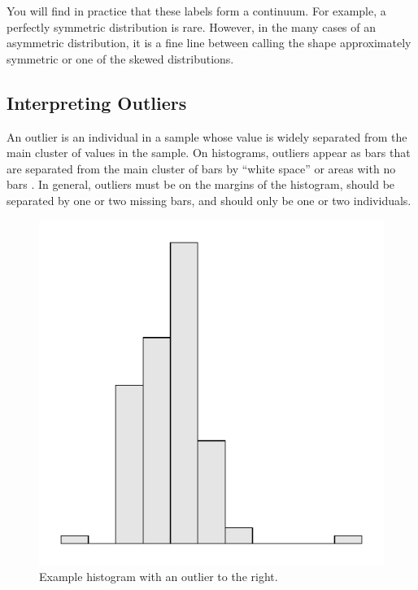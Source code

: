 \documentclass[10pt,openany]{book}\usepackage[]{graphicx}\usepackage[]{color}
\newenvironment{knitrout}{}{} %
\begin{document}
You will find in practice that these labels form a continuum.  For example, a perfectly symmetric distribution is rare.  However, in the many cases of an asymmetric distribution, it is a fine line between calling the shape approximately symmetric or one of the skewed distributions.



\subsection{Interpreting Outliers}
An outlier is an individual in a sample whose value is widely separated from the main cluster of values in the sample.  On histograms, outliers appear as bars that are separated from the main cluster of bars by ``white space'' or areas with no bars .  In general, outliers must be on the margins of the histogram, should be separated by one or two missing bars, and should only be one or two individuals.

\begin{knitrout}
\color{fgcolor}\begin{figure}[hbtp]

{\centering \includegraphics[width=.4\linewidth]{Figs/OutlierExHist-1} 

}

\caption[Example histogram with an outlier to the right]{Example histogram with an outlier to the right.}\label{fig:OutlierExHist}
\end{figure}


\end{knitrout}

\end{document}
